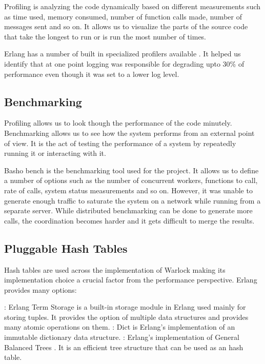 Profiling is analyzing the code dynamically based on different measurements such
as  time used, memory consumed, number of function calls made,
number of messages
sent and so on. It allows us to visualize the parts of the source code that take
the longest to run or is run the most number of times.

Erlang has a number of built in specialized profilers available
\citep{erlang.profiling}. It helped us identify that at one point logging was
responsible for degrading upto 30\% of performance even though it was set to a
lower log level.

\subsection{Benchmarking}

Profiling allows us to look though the performance of the code minutely.
Benchmarking allows us to see how the system performs from an external
point of view. It is the act of testing the performance of a system by
repeatedly running it or interacting with it.

Basho bench \citep{basho.bench} is the benchmarking tool used for the project.
It allows us to define a number of options such as the number of concurrent
workers, functions to call, rate of calls, system status measurements and so
on. However, it was unable to generate enough traffic to saturate the system
on a network while running from a separate server. While distributed
benchmarking can be done to generate more calls, the coordination becomes harder
and it gets difficult to merge the results.

\subsection{Pluggable Hash Tables}

Hash tables are used across the implementation of Warlock making its
implementation choice a crucial factor from the performance perspective.
Erlang provides many options:

\begin{itemize}
    : Erlang Term Storage is a built-in storage module in Erlang
    used mainly for storing tuples. It provides the option of multiple data
    structures and provides many atomic operations on them.
    : Dict is Erlang's implementation of an immutable dictionary
    data structure.
    : Erlang's implementation of General Balanced Trees
    \citep{Andersson99}. It is an efficient tree structure that can be used
    as an hash table.
\end{itemize}

